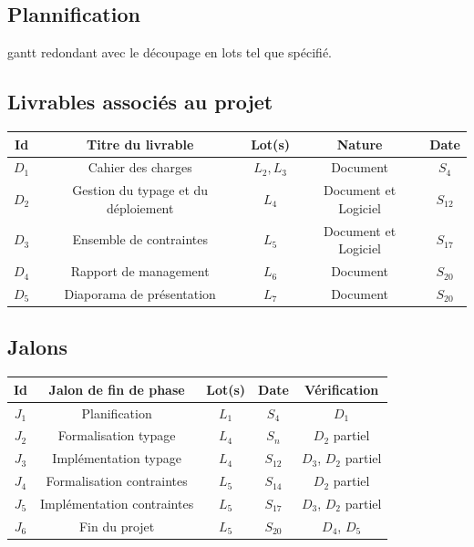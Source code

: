 \documentclass[a4paper]{article}
\begin{document}
\subsection{Plannification}
gantt redondant avec le découpage en lots tel que spécifié.
\subsection{Livrables associés au projet}
\begin{center}
\begin{tabular}{c|c|c|c|c}
	\textbf{Id} & \textbf{Titre du livrable} & \textbf{Lot(s)} & \textbf{Nature} & \textbf{Date} \\
	\hline
	\hline
	$D_1$ & Cahier des charges & $L_2, L_3$ & Document & $S_4$ \\
	\hline
	$D_2$ & Gestion du typage et du déploiement & $L_4$ & Document et Logiciel & $S_{12}$ \\
	\hline
	$D_3$ & Ensemble de contraintes & $L_5$ & Document et Logiciel & $S_{17}$ \\
	\hline
	$D_4$ & Rapport de management & $L_6$ & Document & $S_{20}$ \\
	\hline
	$D_5$ & Diaporama de présentation & $L_7$ & Document & $S_{20}$ \\
\end{tabular}
\end{center}

\subsection{Jalons}
\begin{center}
\begin{tabular}{c|c|c|c|c}
	\textbf{Id} & \textbf{Jalon de fin de phase} & \textbf{Lot(s)} & \textbf{Date} & \textbf{Vérification} \\
	\hline
	\hline
	$J_1$ & Planification & $L_1$ & $S_4$ & $D_1$ \\
	\hline
	$J_2$ & Formalisation typage & $L_4$ & $S_n$ & $D_2$ partiel \\
	\hline
	$J_3$ & Implémentation typage & $L_4$ & $S_{12}$ & $D_3$, $D_2$ partiel \\
	\hline
	$J_4$ & Formalisation contraintes & $L_5$ & $S_{14}$ & $D_2$ partiel \\
	\hline
	$J_5$ & Implémentation contraintes & $L_5$ & $S_{17}$ & $D_3$, $D_2$ partiel \\
	\hline
	$J_6$ & Fin du projet & $L_5$ & $S_{20}$ & $D_4$, $D_5$ \\
\end{tabular}
\end{center}
\end{document}
